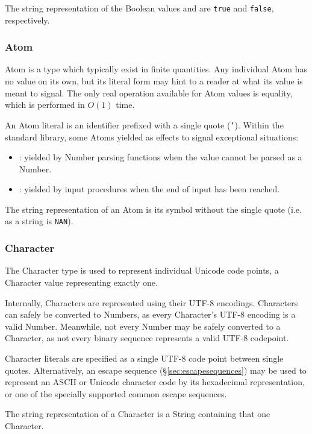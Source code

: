 The string representation of the Boolean values
 and  are \texttt{true} and \texttt{false},
respectively.

\subsubsection{Atom}

Atom is a type which typically exist in finite quantities. Any individual
Atom has no value on its own, but its literal form may hint to a reader at
what its value is meant to signal. The only real operation available for
Atom values is equality, which is performed in $O(1)$ time.

An Atom literal is an identifier prefixed with a single quote (\texttt{'}).
Within the standard library, some Atoms yielded as effects to signal
exceptional situations:

\begin{itemize}
    \item {}: yielded by Number parsing functions when the value
    cannot be parsed as a Number.
    \item {}: yielded by input procedures when the end of input
    has been reached.
\end{itemize}

The string representation of an Atom is its symbol without the single quote
(i.e.  as a string is \texttt{NAN}).

\subsubsection{Character}

The Character type is used to represent individual Unicode code points,
a Character value representing exactly one.

Internally, Characters are represented using their UTF-8 encodings. Characters
can safely be converted to Numbers, as every Character's UTF-8 encoding is a valid
Number. Meanwhile, not every Number may be safely converted to a Character,
as not every binary sequence represents a valid UTF-8 codepoint.

Character literals are specified as a single UTF-8 code point between
single quotes. Alternatively, an escape sequence (\S\ref{sec:escapesequences})
may be used to represent an ASCII or Unicode character code by its hexadecimal
representation, or one of the specially supported common escape sequences.

The string representation of a Character is a String containing that one
Character.

